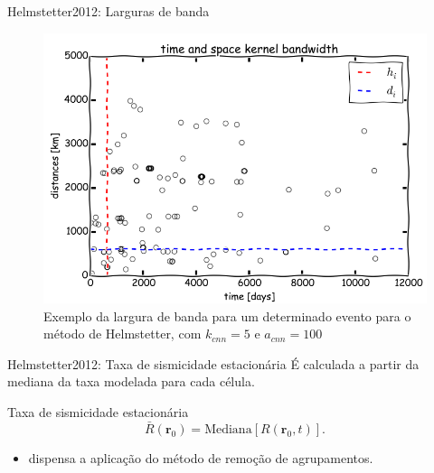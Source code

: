 \documentclass[ucs,8pt]{beamer}
\begin{document}
\begin{frame}{Helmstetter2012: Larguras de banda}
\begin{figure}[H]
  \centering
  \includegraphics[height=.90\textheight]{helmstetter_hidi} 
  \caption{Exemplo da largura de banda para um determinado evento para o método de Helmstetter, com $k_{cnn} = 5$ e
  $a_{cnn} = 100$}
  \label{fig:h_hidi} 
\end{figure}
\end{frame}


\begin{frame}{Helmstetter2012: Taxa de sismicidade estacionária}
	É calculada a partir da mediana da taxa modelada para cada célula.
	\begin{block}{Taxa de sismicidade estacionária}
		\begin{equation}
			\ensuremath{
				\bar{R}(\boldsymbol{r}_0) = \text{Mediana}\left[R(\boldsymbol{r}_0, t)\right].
			}
			\label{eq:helms_mediana}
		\end{equation}
	\end{block}
	\begin{itemize}
		\item dispensa a aplicação do método de remoção de agrupamentos.
	\end{itemize}
\end{frame}
\end{document}
